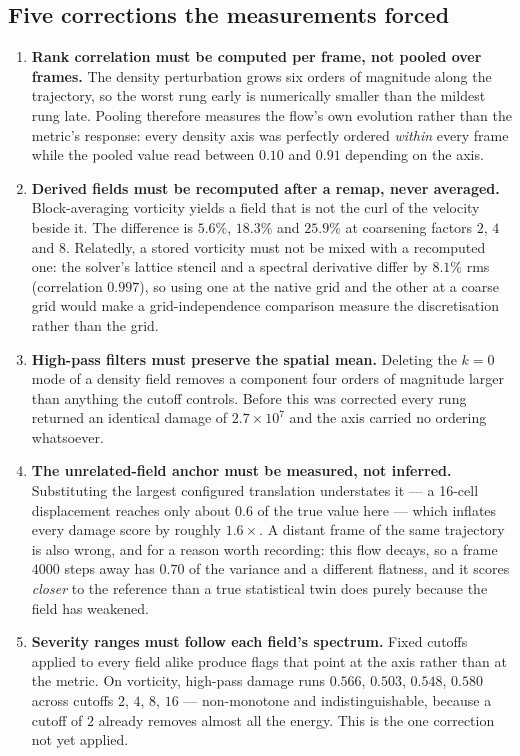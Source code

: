 \documentclass[11pt]{article}
\begin{document}
\subsection{Five corrections the measurements forced}

\begin{enumerate}[leftmargin=*]
\item \textbf{Rank correlation must be computed per frame, not pooled over frames.} The
density perturbation grows six orders of magnitude along the trajectory, so the worst rung
early is numerically smaller than the mildest rung late. Pooling therefore measures the
flow's own evolution rather than the metric's response: every density axis was perfectly
ordered \emph{within} every frame while the pooled value read between $0.10$ and $0.91$
depending on the axis.

\item \textbf{Derived fields must be recomputed after a remap, never averaged.}
Block-averaging vorticity yields a field that is not the curl of the velocity beside it. The
difference is $5.6\%$, $18.3\%$ and $25.9\%$ at coarsening factors $2$, $4$ and $8$.
Relatedly, a stored vorticity must not be mixed with a recomputed one: the solver's lattice
stencil and a spectral derivative differ by $8.1\%$ rms (correlation $0.997$), so using one
at the native grid and the other at a coarse grid would make a grid-independence comparison
measure the discretisation rather than the grid.

\item \textbf{High-pass filters must preserve the spatial mean.} Deleting the $k=0$ mode of
a density field removes a component four orders of magnitude larger than anything the cutoff
controls. Before this was corrected every rung returned an identical damage of $2.7\times
10^{7}$ and the axis carried no ordering whatsoever.

\item \textbf{The unrelated-field anchor must be measured, not inferred.} Substituting the
largest configured translation understates it --- a 16-cell displacement reaches only about
$0.6$ of the true value here --- which inflates every damage score by roughly $1.6\times$. A
distant frame of the same trajectory is also wrong, and for a reason worth recording: this
flow decays, so a frame $4000$ steps away has $0.70$ of the variance and a different
flatness, and it scores \emph{closer} to the reference than a true statistical twin does
purely because the field has weakened.

\item \textbf{Severity ranges must follow each field's spectrum.} Fixed cutoffs applied to
every field alike produce flags that point at the axis rather than at the metric. On
vorticity, high-pass damage runs $0.566$, $0.503$, $0.548$, $0.580$ across cutoffs $2$, $4$,
$8$, $16$ --- non-monotone and indistinguishable, because a cutoff of $2$ already removes
almost all the energy. This is the one correction not yet applied.
\end{enumerate}
\end{document}
